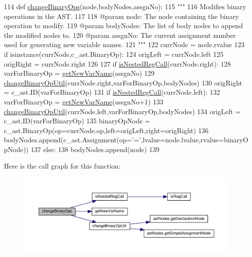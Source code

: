 \begin{DoxyCode}
114 \textcolor{keyword}{def }\hyperlink{namespacePostProcessor_1_1utils_a1ea8f909bf93721481e4fd1bd3f2dff1}{changeBinaryOps}(node,bodyNodes,assgnNo):
115     \textcolor{stringliteral}{"""
}
116 \textcolor{stringliteral}{    Modifies binary operations in the AST.
}
117 \textcolor{stringliteral}{
}
118 \textcolor{stringliteral}{    @param node: The node containing the binary operation to modify.
}
119 \textcolor{stringliteral}{    @param bodyNodes: The list of body nodes to append the modified nodes to.
}
120 \textcolor{stringliteral}{    @param assgnNo: The current assignment number used for generating new variable names.
}
121 \textcolor{stringliteral}{    """}
122     currNode = node.rvalue
123     \textcolor{keywordflow}{if} isinstance(currNode,c\_ast.BinaryOp):
124         origLeft = currNode.left
125         origRight = currNode.right
126         
127         \textcolor{keywordflow}{if} \hyperlink{namespacePostProcessor_1_1utils_a86292ec94138d20acb13a3c9c136a468}{isNestedRegCall}(currNode.right):
128             varForBinaryOp = \hyperlink{namespacePostProcessor_1_1utils_a69c4094b747eccefbd43b8011b1c3626}{getNewVarName}(assgnNo)
129             \hyperlink{namespacePostProcessor_1_1utils_ab12ae71cedd8ec3fcbfedd7a6dbe6599}{changeBinaryOpUtil}(currNode.right,varForBinaryOp,bodyNodes)
130             origRight = c\_ast.ID(varForBinaryOp)
131         \textcolor{keywordflow}{if} \hyperlink{namespacePostProcessor_1_1utils_a86292ec94138d20acb13a3c9c136a468}{isNestedRegCall}(currNode.left):
132             varForBinaryOp = \hyperlink{namespacePostProcessor_1_1utils_a69c4094b747eccefbd43b8011b1c3626}{getNewVarName}(assgnNo+1)
133             \hyperlink{namespacePostProcessor_1_1utils_ab12ae71cedd8ec3fcbfedd7a6dbe6599}{changeBinaryOpUtil}(currNode.left,varForBinaryOp,bodyNodes)
134             origLeft = c\_ast.ID(varForBinaryOp)
135         binaryOpNode = c\_ast.BinaryOp(op=currNode.op,left=origLeft,right=origRight)
136         bodyNodes.append(c\_ast.Assignment(op=\textcolor{stringliteral}{'='},lvalue=node.lvalue,rvalue=binaryOpNode))
137     \textcolor{keywordflow}{else}:
138         bodyNodes.append(node)
139 
\end{DoxyCode}
Here is the call graph for this function\+:\nopagebreak
\begin{figure}[H]
\begin{center}
\leavevmode
\includegraphics[width=350pt]{namespacePostProcessor_1_1utils_a1ea8f909bf93721481e4fd1bd3f2dff1_cgraph}
\end{center}
\end{figure}
